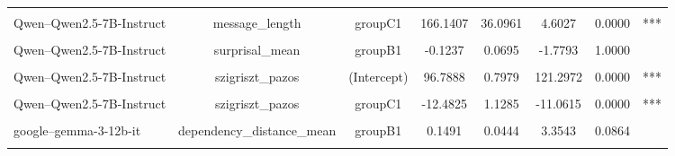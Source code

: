 \begin{table}[!h]
{\begin{tabular}{lccccccc}
\addlinespace
\cellcolor{gray!10}{Qwen--Qwen2.5-7B-Instruct} & \cellcolor{gray!10}{message_length} & \cellcolor{gray!10}{groupB1} & \cellcolor{gray!10}{110.4185} & \cellcolor{gray!10}{36.0961} & \cellcolor{gray!10}{3.0590} & \cellcolor{gray!10}{0.2160} & \cellcolor{gray!10}{}\\
Qwen--Qwen2.5-7B-Instruct & message_length & groupC1 & 166.1407 & 36.0961 & 4.6027 & 0.0000 & ***\\
\cellcolor{gray!10}{Qwen--Qwen2.5-7B-Instruct} & \cellcolor{gray!10}{surprisal_mean} & \cellcolor{gray!10}{(Intercept)} & \cellcolor{gray!10}{1.4898} & \cellcolor{gray!10}{0.0491} & \cellcolor{gray!10}{30.3121} & \cellcolor{gray!10}{0.0000} & \cellcolor{gray!10}{***}\\
Qwen--Qwen2.5-7B-Instruct & surprisal_mean & groupB1 & -0.1237 & 0.0695 & -1.7793 & 1.0000 & \\
\cellcolor{gray!10}{Qwen--Qwen2.5-7B-Instruct} & \cellcolor{gray!10}{surprisal_mean} & \cellcolor{gray!10}{groupC1} & \cellcolor{gray!10}{-0.1338} & \cellcolor{gray!10}{0.0695} & \cellcolor{gray!10}{-1.9247} & \cellcolor{gray!10}{1.0000} & \cellcolor{gray!10}{}\\
\addlinespace
Qwen--Qwen2.5-7B-Instruct & szigriszt_pazos & (Intercept) & 96.7888 & 0.7979 & 121.2972 & 0.0000 & ***\\
\cellcolor{gray!10}{Qwen--Qwen2.5-7B-Instruct} & \cellcolor{gray!10}{szigriszt_pazos} & \cellcolor{gray!10}{groupB1} & \cellcolor{gray!10}{-8.6988} & \cellcolor{gray!10}{1.1285} & \cellcolor{gray!10}{-7.7085} & \cellcolor{gray!10}{0.0000} & \cellcolor{gray!10}{***}\\
Qwen--Qwen2.5-7B-Instruct & szigriszt_pazos & groupC1 & -12.4825 & 1.1285 & -11.0615 & 0.0000 & ***\\
\cellcolor{gray!10}{google--gemma-3-12b-it} & \cellcolor{gray!10}{dependency_distance_mean} & \cellcolor{gray!10}{(Intercept)} & \cellcolor{gray!10}{2.3462} & \cellcolor{gray!10}{0.0314} & \cellcolor{gray!10}{74.6559} & \cellcolor{gray!10}{0.0000} & \cellcolor{gray!10}{***}\\
google--gemma-3-12b-it & dependency_distance_mean & groupB1 & 0.1491 & 0.0444 & 3.3543 & 0.0864 & \\
\addlinespace
\cellcolor{gray!10}{google--gemma-3-12b-it} & \cellcolor{gray!10}{dependency_distance_mean} & \cellcolor{gray!10}{groupC1} & \cellcolor{gray!10}{0.1758} & \cellcolor{gray!10}{0.0444} & \cellcolor{gray!10}{3.9555} & \cellcolor{gray!10}{0.0144} & \cellcolor{gray!10}{*}\\

\end{tabular}}
\end{table}
